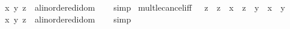\begin{isabellebody}
\ \ \ x\ y\ z\ {\isacharcolon}{\kern0pt}{\isacharcolon}{\kern0pt}\ {\isachardoublequoteopen}{\isacharprime}{\kern0pt}a{\isacharcolon}{\kern0pt}{\isacharcolon}{\kern0pt}linordered{\isacharunderscore}{\kern0pt}idom{\isachardoublequoteclose}\isanewline
%
\isadelimproof
\ \ %
\endisadelimproof
%
\isatagproof
{}\isamarkupfalse%
\ simp%
\endisatagproof
{\isafoldproof}%
%
\isadelimproof
\isanewline
%
\endisadelimproof
\isanewline
{}\isamarkupfalse%
\ mult{\isacharunderscore}{\kern0pt}le{\isacharunderscore}{\kern0pt}cancel{\isacharunderscore}{\kern0pt}iff{}{\isacharcolon}{\kern0pt}\ {\isachardoublequoteopen}{}\ {\isacharless}{\kern0pt}\ z\ {\isasymLongrightarrow}\ z\ {\isacharasterisk}{\kern0pt}\ x\ {\isasymle}\ z\ {\isacharasterisk}{\kern0pt}\ y\ {\isasymlongleftrightarrow}\ x\ {\isasymle}\ y{\isachardoublequoteclose}\isanewline
\ \ \ x\ y\ z\ {\isacharcolon}{\kern0pt}{\isacharcolon}{\kern0pt}\ {\isachardoublequoteopen}{\isacharprime}{\kern0pt}a{\isacharcolon}{\kern0pt}{\isacharcolon}{\kern0pt}linordered{\isacharunderscore}{\kern0pt}idom{\isachardoublequoteclose}\isanewline
%
\isadelimproof
\ \ %
\endisadelimproof
%
\isatagproof
{}\isamarkupfalse%
\ simp%
\endisatagproof
{\isafoldproof}%
%
\isadelimproof
\ \isanewline
%
\endisadelimproof
%
\isadelimtheory
\isanewline
%
\endisadelimtheory
%
\isatagtheory
{}\isamarkupfalse%
%
\endisatagtheory
{\isafoldtheory}%
%
\isadelimtheory
%
\endisadelimtheory
%
\end{isabellebody}%
\endinput

